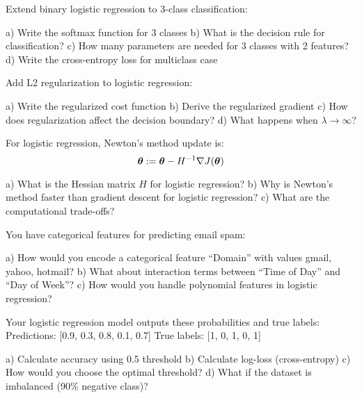 \documentclass{article}
\newcounter{exercise}
\begin{document}
\begin{tcolorbox}[colback=gray!5!white,colframe=gray!75!black,title=Problem \stepcounter{exercise}: Multiclass Extension]

Extend binary logistic regression to 3-class classification:

a) Write the softmax function for 3 classes
b) What is the decision rule for classification?
c) How many parameters are needed for 3 classes with 2 features?
d) Write the cross-entropy loss for multiclass case
\end{tcolorbox}

\begin{tcolorbox}[colback=gray!5!white,colframe=gray!75!black,title=Problem \stepcounter{exercise}: Regularization]

Add L2 regularization to logistic regression:

a) Write the regularized cost function
b) Derive the regularized gradient
c) How does regularization affect the decision boundary?
d) What happens when $\lambda \to \infty$?
\end{tcolorbox}

\begin{tcolorbox}[colback=gray!5!white,colframe=gray!75!black,title=Problem \stepcounter{exercise}: Newton's Method]

For logistic regression, Newton's method update is:
$$\boldsymbol{\theta} := \boldsymbol{\theta} - H^{-1} \nabla J(\boldsymbol{\theta})$$

a) What is the Hessian matrix $H$ for logistic regression?
b) Why is Newton's method faster than gradient descent for logistic regression?
c) What are the computational trade-offs?
\end{tcolorbox}

\begin{tcolorbox}[colback=gray!5!white,colframe=gray!75!black,title=Problem \stepcounter{exercise}: Feature Engineering]

You have categorical features for predicting email spam:

a) How would you encode a categorical feature ``Domain'' with values {gmail, yahoo, hotmail}?
b) What about interaction terms between ``Time of Day'' and ``Day of Week''?
c) How would you handle polynomial features in logistic regression?
\end{tcolorbox}

\begin{tcolorbox}[colback=gray!5!white,colframe=gray!75!black,title=Problem \stepcounter{exercise}: Model Evaluation]

Your logistic regression model outputs these probabilities and true labels:
Predictions: [0.9, 0.3, 0.8, 0.1, 0.7]
True labels: [1, 0, 1, 0, 1]

a) Calculate accuracy using 0.5 threshold
b) Calculate log-loss (cross-entropy)
c) How would you choose the optimal threshold?
d) What if the dataset is imbalanced (90\% negative class)?
\end{tcolorbox}
\end{document}

